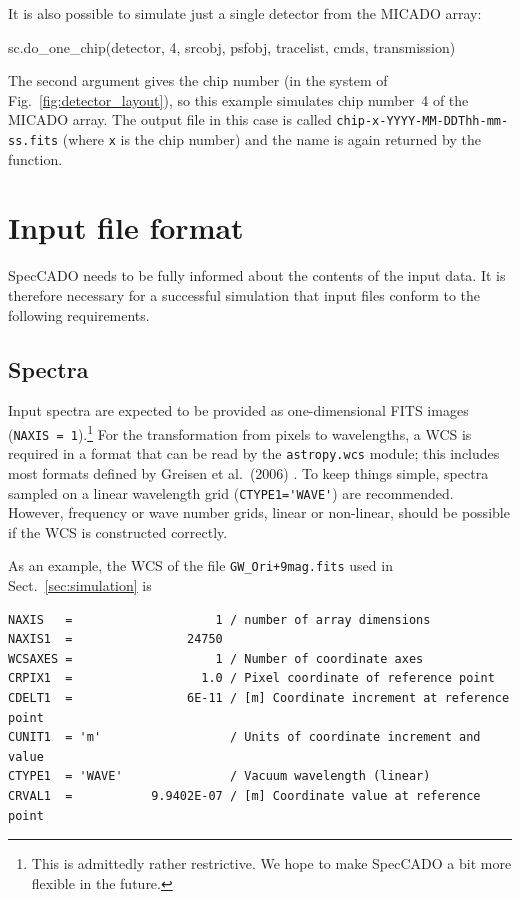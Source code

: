 \documentclass[a4paper,twoside,11pt]{article}
\begin{document}
It is also possible to simulate just a single detector from the MICADO
array:
\begin{pyin}
sc.do_one_chip(detector, 4, srcobj, psfobj, tracelist, cmds,
               transmission)
\end{pyin}
The second argument gives the chip number (in the system of
Fig.~\ref{fig:detector_layout}), so this example simulates chip
number~4 of the MICADO array. The output file in this case is called
\lstinline{chip-x-YYYY-MM-DDThh-mm-ss.fits} (where \lstinline{x} is
the chip number) and the name is again returned by the function.


\section{Input file format}
\label{sec:input_format}

SpecCADO needs to be fully informed about the contents of the input
data. It is therefore necessary for a successful simulation that input
files conform to the following requirements.

\subsection{Spectra}
\label{ssec:input_spectra}

Input spectra are expected to be provided as one-dimensional FITS
images (\lstinline{NAXIS = 1}).\footnote{This is admittedly rather
  restrictive. We hope to make SpecCADO a bit more flexible in the
  future.}  For the transformation from pixels to wavelengths, a WCS
is required in a format that can be read by the
\lstinline{astropy.wcs} module; this includes most formats defined by
Greisen et al.\ (2006) \cite{Greisen2006}. To keep things simple,
spectra sampled on a linear wavelength grid
(\lstinline{CTYPE1='WAVE'}) are recommended. However, frequency or
wave number grids, linear or non-linear, should be possible if the WCS
is constructed correctly.

As an example, the WCS of the file \lstinline{GW_Ori+9mag.fits} used
in Sect.~\ref{sec:simulation} is
\begin{lstlisting}
NAXIS   =                    1 / number of array dimensions
NAXIS1  =                24750
WCSAXES =                    1 / Number of coordinate axes
CRPIX1  =                  1.0 / Pixel coordinate of reference point
CDELT1  =                6E-11 / [m] Coordinate increment at reference point
CUNIT1  = 'm'                  / Units of coordinate increment and value
CTYPE1  = 'WAVE'               / Vacuum wavelength (linear)
CRVAL1  =           9.9402E-07 / [m] Coordinate value at reference point
\end{lstlisting}
\end{document}
